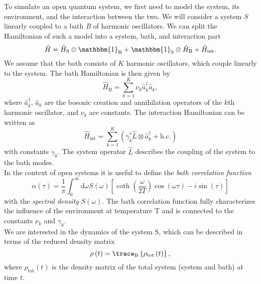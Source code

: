 To simulate an open quantum system, we first need to model the system, its environment, and the interaction between the two.
We will consider a system \textit{S} linearly coupled to a bath \textit{B} of harmonic oscillators. 
We can split the Hamiltonian of such a model into a system, bath, and interaction part
\begin{equation*}
    \hat{H} = \hat{H}_\text{S} \otimes \mathbbm{1}_\text{B} + \mathbbm{1}_\text{S} \otimes \hat{H}_\text{B}
    + \hat{H}_\text{int}.
\end{equation*}
We assume that the bath consists of $K$ harmonic oscillators, which couple linearly to the system. 
The bath Hamiltonian is then given by
\begin{equation*}
    \hat{H}_\text{B} = \sum_{k=1}^{K}\nu_{k} 
    \hat{a}^\dagger_{k} \hat{a}_{k},
\end{equation*}
where $\hat{a}^\dagger_{k}$, $\hat{a}_{k}$ are the bosonic creation and annihilation
operators of the $k$th harmonic oscillator, and $\nu_{k}$ are constants.
The interaction Hamiltonian can be written as
\begin{equation*}
    \hat{H}_\text{int} = \sum_{k=1}^{K} \left( \gamma_{k}^*
    \hat{L} \otimes \hat{a}_{k}^\dagger + \text{h.c.} \right)
\end{equation*}
with constants $\gamma_{k}$. The system operator $\hat{L}$ describes the coupling
of the system to the bath modes.
\\
In the context of open systems it is useful to 
define the \textit{bath correlation function}
\begin{equation}
    \label{eq:bath_correlation_function}
    \alpha(\tau) = \frac{1}{\pi} \int_0^\infty \text{d}\omega S(\omega) 
    \left[\coth\left(\frac{\omega}{2T}\right)\cos\left(\omega\tau\right)-i\sin\left(\tau\right)\right]
\end{equation}
with the \textit{spectral density} $S\left(\omega\right)$. The bath correlation function fully
characterizes the influence of the environment at temperature T \cite{Gao:2022} and is connected
to the constants $\nu_{k}$ and $\gamma_{k}$.
\\
We are interested in the dynamics of the system S, which can be described in terms of the reduced
density matrix
\begin{equation*}
    \rho\left(t\right) = \trace_\text{B}\left\{\rho_\text{tot}\left(t\right)\right\},
\end{equation*}
where $\rho_\text{tot}\left(t\right)$ is the density matrix of the total system (system and bath) at time $t$.
